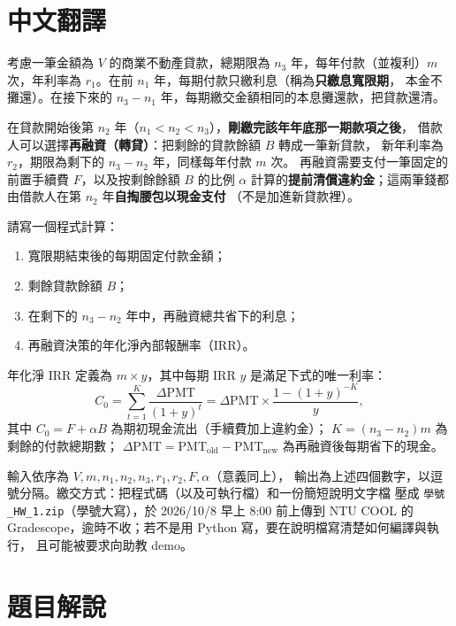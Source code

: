\documentclass[11pt,a4paper]{article}
\begin{document}
\section{中文翻譯}

考慮一筆金額為 $V$ 的商業不動產貸款，總期限為 $n_3$ 年，每年付款（並複利）$m$
次，年利率為 $r_1$。在前 $n_1$ 年，每期付款只繳利息（稱為\textbf{只繳息寬限期}，
本金不攤還）。在接下來的 $n_3-n_1$ 年，每期繳交金額相同的本息攤還款，把貸款還清。

在貸款開始後第 $n_2$ 年（$n_1<n_2<n_3$），\textbf{剛繳完該年年底那一期款項之後}，
借款人可以選擇\textbf{再融資（轉貸）}：把剩餘的貸款餘額 $B$ 轉成一筆新貸款，
新年利率為 $r_2$，期限為剩下的 $n_3-n_2$ 年，同樣每年付款 $m$ 次。
再融資需要支付一筆固定的前置手續費 $F$，以及按剩餘餘額 $B$ 的比例 $\alpha$
計算的\textbf{提前清償違約金}；這兩筆錢都由借款人在第 $n_2$ 年\textbf{自掏腰包以現金支付}
（不是加進新貸款裡）。

請寫一個程式計算：
\begin{enumerate}[nosep]
  \item 寬限期結束後的每期固定付款金額；
  \item 剩餘貸款餘額 $B$；
  \item 在剩下的 $n_3-n_2$ 年中，再融資總共省下的利息；
  \item 再融資決策的年化淨內部報酬率（IRR）。
\end{enumerate}

年化淨 IRR 定義為 $m\times y$，其中每期 IRR $y$ 是滿足下式的唯一利率：
\[
  C_0=\sum_{t=1}^{K}\frac{\Delta\mathrm{PMT}}{(1+y)^t}
     =\Delta\mathrm{PMT}\times\frac{1-(1+y)^{-K}}{y},
\]
其中 $C_0=F+\alpha B$ 為期初現金流出（手續費加上違約金）；
$K=(n_3-n_2)m$ 為剩餘的付款總期數；
$\Delta\mathrm{PMT}=\mathrm{PMT}_{\text{old}}-\mathrm{PMT}_{\text{new}}$
為再融資後每期省下的現金。

輸入依序為 $V, m, n_1, n_2, n_3, r_1, r_2, F, \alpha$（意義同上），
輸出為上述四個數字，以逗號分隔。繳交方式：把程式碼（以及可執行檔）和一份簡短說明文字檔
壓成 \texttt{學號\_HW\_1.zip}（學號大寫），於 2026/10/8 早上 8:00 前上傳到 NTU COOL
的 Gradescope，逾時不收；若不是用 Python 寫，要在說明檔寫清楚如何編譯與執行，
且可能被要求向助教 demo。

\section{題目解說}
\end{document}
